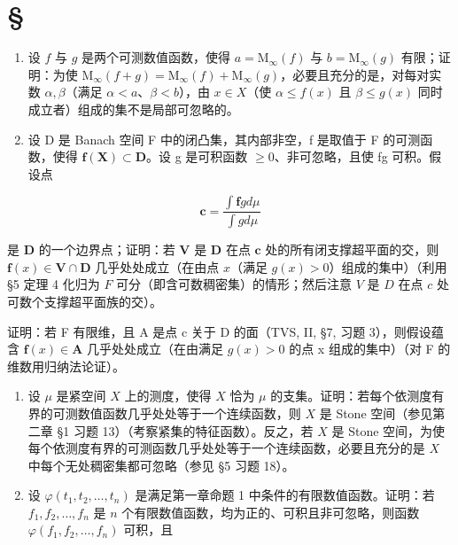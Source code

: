 \section*{\texorpdfstring{\S\CurrentExerciseGroup}{第{\CurrentExerciseGroup}节}}
{}

\begin{enumerate}
\def\labelenumi{\arabic{enumi})}
\item
  设 \(f\) 与 \(g\) 是两个可测数值函数，使得 \(a = \mathrm{M}_{\infty}(f)\) 与 \(b = \mathrm{M}_{\infty}(g)\) 有限；证明：为使 \(\mathrm{M}_{\infty}(f + g) = \mathrm{M}_{\infty}(f) + \mathrm{M}_{\infty}(g)\)，必要且充分的是，对每对实数 \(\alpha, \beta\)（满足 \(\alpha < a\)、\(\beta < b\)），由 \(x \in X\)（使 \(\alpha \leqslant f(x)\) 且 \(\beta \leqslant g(x)\) 同时成立者）组成的集不是局部可忽略的。
\item
  设 D 是 Banach 空间 F 中的闭凸集，其内部非空，f 是取值于 F 的可测函数，使得 \(\mathbf{f}(\mathbf{X}) \subset \mathbf{D}\)。设 g 是可积函数 \(\geqslant 0\)、非可忽略，且使 fg 可积。假设点
\end{enumerate}

\[
\mathbf {c} = \frac {\int \mathbf {f} g d \mu}{\int g d \mu}
\]

是 \(\mathbf{D}\) 的一个边界点；证明：若 \(\mathbf{V}\) 是 \(\mathbf{D}\) 在点 \(\mathbf{c}\) 处的所有闭支撑超平面的交，则 \(\mathbf{f}(x) \in \mathbf{V} \cap \mathbf{D}\) 几乎处处成立（在由点 \(x\)（满足 \(g(x) > 0\)）组成的集中）（利用 §5 定理 4 化归为 \(F\) 可分（即含可数稠密集）的情形；然后注意 \(V\) 是 \(D\) 在点 \(c\) 处可数个支撑超平面族的交）。

证明：若 F 有限维，且 A 是点 c 关于 D 的面（TVS, II, §7, 习题 3），则假设蕴含 \(\mathbf{f}(x) \in \mathbf{A}\) 几乎处处成立（在由满足 \(g(x) > 0\) 的点 x 组成的集中）（对 F 的维数用归纳法论证）。

\begin{enumerate}
\def\labelenumi{\arabic{enumi})}
\setcounter{enumi}{2}
\item
  设 \(\mu\) 是紧空间 \(X\) 上的测度，使得 \(X\) 恰为 \(\mu\) 的支集。证明：若每个依测度有界的可测数值函数几乎处处等于一个连续函数，则 \(X\) 是 Stone 空间（参见第二章 §1 习题 13）（考察紧集的特征函数）。反之，若 \(X\) 是 Stone 空间，为使每个依测度有界的可测函数几乎处处等于一个连续函数，必要且充分的是 \(X\) 中每个无处稠密集都可忽略（参见 §5 习题 18）。
\item
  设 \(\varphi(t_1, t_2, \ldots, t_n)\) 是满足第一章命题 1 中条件的有限数值函数。证明：若 \(f_1, f_2, \ldots, f_n\) 是 \(n\) 个有限数值函数，均为正的、可积且非可忽略，则函数 \(\varphi(f_1, f_2, \ldots, f_n)\) 可积，且
\end{enumerate}

